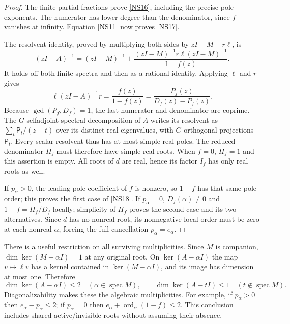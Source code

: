 \documentclass[11pt]{article}
\newcommand{\ord}{\operatorname{ord}}
\begin{document}
\begin{proof}
The finite partial fractions prove \eqref{NS16}, including
the precise pole exponents. The numerator has lower degree
than the denominator, since $f$ vanishes at infinity.
Equation \eqref{NS11} now proves \eqref{NS17}.

The resolvent identity, proved by multiplying both sides
by $zI-M-r\ell$, is
\begin{equation}\tag{NS19}\label{NS19}
(zI-A)^{-1}
=(zI-M)^{-1}
 +\frac{(zI-M)^{-1}r\ell(zI-M)^{-1}}{1-f(z)}.
\end{equation}
It holds off both finite spectra and then as a rational
identity. Applying $\ell$ and $r$ gives
\[
\ell(zI-A)^{-1}r=\frac{f(z)}{1-f(z)}
                 =\frac{P_f(z)}{D_f(z)-P_f(z)}.
\]
Because $\gcd(P_f,D_f)=1$, the last numerator and
denominator are coprime. The $G$-selfadjoint spectral
decomposition of $A$ writes its resolvent as
$\sum_t\mathsf P_t/(z-t)$ over its distinct real
eigenvalues, with $G$-orthogonal projections $\mathsf P_t$.
Every scalar resolvent thus has at most simple real poles.
The reduced denominator $H_f$ must therefore have simple
real roots. When $f=0$, $H_f=1$ and this assertion is empty.
All roots of $d$ are real, hence its factor $I_f$ has
only real roots as well.

If $p_\alpha>0$, the leading pole coefficient of $f$
is nonzero, so $1-f$ has that same pole order; this proves
the first case of \eqref{NS18}. If $p_\alpha=0$,
$D_f(\alpha)\ne0$ and $1-f=H_f/D_f$ locally; simplicity
of $H_f$ proves the second case and its two alternatives.
Since $d$ has no nonreal root, its nonnegative local
order must be zero at each nonreal $\alpha$, forcing
the full cancellation $p_\alpha=e_\alpha$.
\end{proof}

There is a useful restriction on all surviving multiplicities.
Since $M$ is companion, $\dim\ker(M-\alpha I)=1$ at any
original root. On $\ker(A-\alpha I)$ the map $v\mapsto\ell v$
has a kernel contained in $\ker(M-\alpha I)$, and its image
has dimension at most one. Therefore
\begin{equation}\tag{NS20}\label{NS20}
\dim\ker(A-\alpha I)\leq2
\quad(\alpha\in\operatorname{spec}M),\qquad
\dim\ker(A-tI)\leq1
\quad(t\notin\operatorname{spec}M).
\end{equation}
Diagonalizability makes these the algebraic multiplicities.
For example, if $p_\alpha>0$ then $e_\alpha-p_\alpha\leq2$;
if $p_\alpha=0$ then
$e_\alpha+\ord_\alpha(1-f)\leq2$.
This conclusion includes shared active/invisible roots
without assuming their absence.
\end{document}
